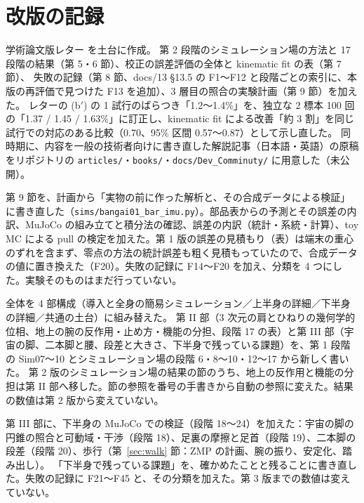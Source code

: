 \documentclass[paper=a4paper,fontsize=10pt,twocolumn,column_gap=2zw,line_length=24zw,number_of_lines=46,head_space=20mm]{jlreq}
\begin{document}
\section{改版の記録}
\small
\begin{description}\setlength{\itemsep}{0pt}
\item[第 1 版（2026-11-26）] 学術論文版レター \cite{letter2026} を土台に作成。
第 2 段階のシミュレーション場の方法と 17 段階の結果（第 5・6 節）、校正の誤差評価の全体と kinematic fit の表（第 7 節）、
失敗の記録（第 8 節、docs/13 §13.5 の F1〜F12 と段階ごとの索引に、本版の再評価で見つけた F13 を追加）、3 層目の照合の実験計画（第 9 節）を加えた。
レターの (b$'$) の 1 試行のばらつき「1.2〜1.4\%」を、独立な 2 標本 100 回の「1.37 / 1.45 / 1.63\%」に訂正し、kinematic fit による改善「約 3 割」を同じ試行での対応のある比較（0.70、95\% 区間 0.57〜0.87）として示し直した。
同時期に、内容を一般の技術者向けに書き直した解説記事（日本語・英語）の原稿をリポジトリの \texttt{articles/}・\texttt{books/}・\texttt{docs/Dev\_Comminuty/} に用意した（未公開）。
\item[第 2 版（2026-11-26）] 第 9 節を、計画から「実物の前に作った解析と、その合成データによる検証」に書き直した（\texttt{sims/bangai01\_bar\_imu.py}）。部品表からの予測とその誤差の内訳、MuJoCo の組み立てと積分法の確認、誤差の内訳（統計・系統・計算）、toy MC による pull の検定を加えた。第 1 版の誤差の見積もり（表）は端末の重心のずれを含まず、零点の方法の統計誤差も粗く見積もっていたので、合成データの値に置き換えた（F20）。失敗の記録に F14〜F20 を加え、分類を 4 つにした。実験そのものはまだ行っていない。
\item[第 3 版（2026-11-26）] 全体を 4 部構成（導入と全身の簡易シミュレーション／上半身の詳細／下半身の詳細／共通の土台）に組み替えた。
第 II 部（3 次元の肩とひねりの幾何学的位相、地上の腕の反作用・止め方・機能の分担、段階 17 の表）と第 III 部（宇宙の脚、二本脚と腰、段差と大きさ、下半身で残っている課題）を、第 1 段階の Sim07〜10 とシミュレーション場の段階 6・8〜10・12〜17 から新しく書いた。
第 2 版のシミュレーション場の結果の節のうち、地上の反作用と機能の分担は第 II 部へ移した。節の参照を番号の手書きから自動の参照に変えた。結果の数値は第 2 版から変えていない。
\item[第 4 版（2026-11-27）] 第 III 部に、下半身の MuJoCo での検証（段階 18〜24）を加えた：宇宙の脚の円錐の照合と可動域・干渉（段階 18）、足裏の摩擦と足首（段階 19）、二本脚の段差（段階 20）、歩行（第~\ref{sec:walk} 節：ZMP の計画、腕の振り、安定化、踏み出し）。
「下半身で残っている課題」を、確かめたことと残ることに書き直した。失敗の記録に F21〜F45 と、その分類を加えた。第 3 版までの数値は変えていない。
\end{description}
\end{document}
